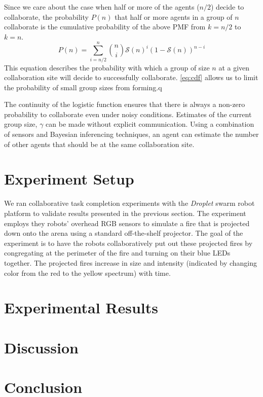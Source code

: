 \documentclass[conference]{ieeeconf}
\def\estg{\gamma}
\newcommand{\sig}{\mathcal{S}}
\begin{document}
Since we care about the case when half or more of the agents ($n/2$) decide to collaborate, the probability $P(n)$ that half or more agents in a group of $n$ collaborate is the cumulative probability of the above PMF from $k = {n/2}$ to $k = n$. 
\begin{equation}
	P(n) = \sum\limits_{i={n/2}}^{n}\binom{n}{i}\sig(n)^{i}\left(1 - \sig(n)\right)^{n - i}\label{eq:cdf}
\end{equation}
This equation describes the probability with which a group of size $n$ at a given collaboration site will decide to successfully collaborate. \eqref{eq:cdf} allows us to limit the probability of small group sizes from forming.q 

The continuity of the logistic function ensures that there is always a non-zero probability to collaborate even under noisy conditions. Estimates of the current group size, $\estg$ can be made without explicit communication. Using a combination of sensors and Bayesian inferencing techniques, an agent can estimate the number of other agents that should be at the same collaboration site. 


\section{Experiment Setup}\label{sec:expsetup}
We ran collaborative task completion experiments with the \emph{Droplet} swarm robot platform to validate results presented in the previous section. The experiment employs they robots' overhead RGB sensors to simulate a fire that is projected down onto the arena using a standard off-the-shelf projector. The goal of the experiment is to have the robots collaboratively put out these projected fires by congregating at the perimeter of the fire and turning on their blue LEDs together. The projected fires increase in size and intensity (indicated by changing color from the red to the yellow spectrum) with time.



\section{Experimental Results}\label{sec:expresults}




\section{Discussion}\label{sec:disc}




\section{Conclusion}\label{sec:conc}





\end{document}
